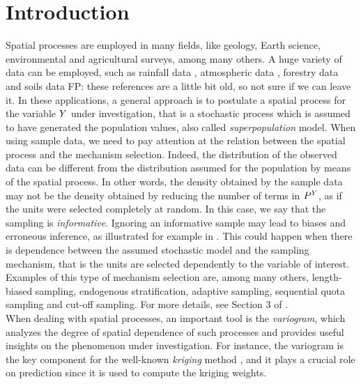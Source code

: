 \section{Introduction} \label{sec:intro}
Spatial processes are employed in many fields, like geology, Earth science, environmental and agricultural surveys, among many others. A huge variety of data can be employed, such as rainfall data \citep{ord1979spatial}, atmospheric data \citep{thiebaux1987spatial}, forestry data \citep{samra1989spatial} and soils data \citep{burgess1980optimal} {\color{red} FP: these references are a little bit old, so not sure if we can leave it}. In these applications, a general approach is to postulate a spatial process for the variable $Y$ under investigation, that is a stochastic process which is assumed to have generated the population values, also called \emph{superpopulation} model. %
When using sample data, we need to pay attention at the relation between the spatial process and the mechanism selection. Indeed, the distribution of the observed data can be different from the distribution assumed for the population by means of the spatial process. In other words, the density obtained by the sample data may not be the density obtained by reducing the number of terms in $P^{Y}$, as if the units were selected completely at random. In this case, we say that the sampling is \emph{informative}. Ignoring an informative sample may lead to biases and erroneous inference, as illustrated for example in \cite{skinner1989analysis}. This could happen when there is dependence between the assumed stochastic model and the sampling mechanism, that is the units are selected dependently to the variable of interest. Examples of this type of mechanism selection are, among many others, length-biased sampling, endogenous stratification, adaptive sampling, sequential quota sampling and cut-off sampling. For more details, see Section 3 of \cite{bonnery2012uniform}.
\\ When dealing with spatial processes, an important tool is the \emph{variogram}, which analyzes the degree of spatial dependence of such processes and provides useful insights on the phenomenon under investigation. For instance, the variogram is the key component for the well-known \emph{kriging} method \citep{matheron1962traite}, and it plays a crucial role on prediction since it is used to compute the kriging weights. 
